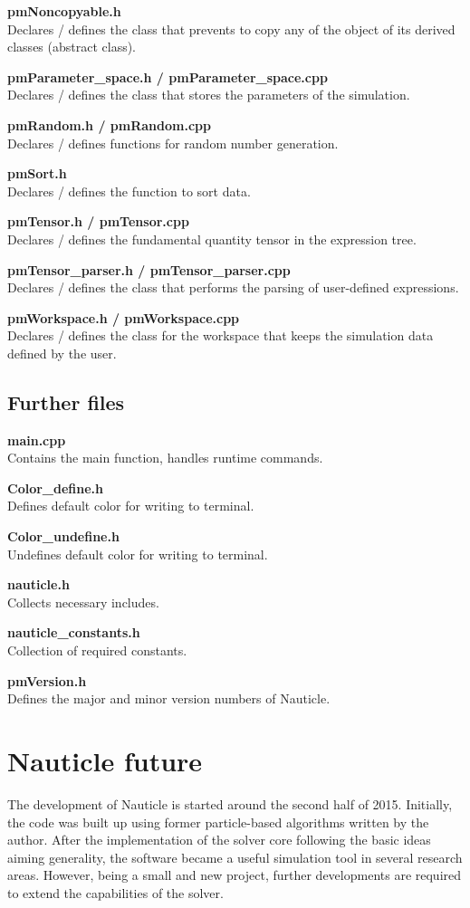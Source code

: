 \documentclass[a4paper,12pt,openany]{book}
\theoremstyle{break}
\begin{document}
\textbf{pmNoncopyable.h} \\
Declares / defines the class that prevents to copy any of the object of its derived classes (abstract class).

\textbf{pmParameter\_space.h / pmParameter\_space.cpp} \\
Declares / defines the class that stores the parameters of the simulation.

\textbf{pmRandom.h / pmRandom.cpp} \\
Declares / defines functions for random number generation.

\textbf{pmSort.h} \\
Declares / defines the function to sort data.

\textbf{pmTensor.h / pmTensor.cpp} \\
Declares / defines the fundamental quantity tensor in the expression tree.

\textbf{pmTensor\_parser.h / pmTensor\_parser.cpp} \\
Declares / defines the class that performs the parsing of user-defined expressions.

\textbf{pmWorkspace.h / pmWorkspace.cpp} \\
Declares / defines the class for the workspace that keeps the simulation data defined by the user.


\subsection{Further files}

\textbf{main.cpp} \\
Contains the main function, handles runtime commands.

\textbf{Color\_define.h} \\
Defines default color for writing to terminal.

\textbf{Color\_undefine.h} \\
Undefines default color for writing to terminal.

\textbf{nauticle.h} \\
Collects necessary includes.

\textbf{nauticle\_constants.h} \\
Collection of required constants.

\textbf{pmVersion.h} \\
Defines the major and minor version numbers of Nauticle.


\section{Nauticle future}
The development of Nauticle is started around the second half of 2015. Initially, the code was built up using former particle-based algorithms written by the author. After the implementation of the solver core following the basic ideas aiming generality, the software became a useful simulation tool in several research areas. However, being a small and new project, further developments are required to extend the capabilities of the solver.
\end{document}
